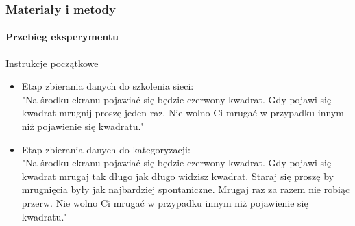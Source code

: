 \documentclass{beamer}
\begin{document}
\begin{frame}	
    \frametitle{Materiały i metody}
    \framesubtitle{Przebieg eksperymentu}
    \pause
    \begin{block}{Instrukcje początkowe}
        \pause
        \begin{itemize} [<+->]
            \item Etap zbierania danych do szkolenia sieci:\\
                "Na środku ekranu pojawiać się będzie czerwony kwadrat. 
                Gdy pojawi się kwadrat mrugnij proszę jeden raz. 
                Nie wolno Ci mrugać w przypadku innym niż pojawienie się kwadratu." 
            \item Etap zbierania danych do kategoryzacji:\\
                "Na środku ekranu pojawiać się będzie czerwony kwadrat. 
                Gdy pojawi się kwadrat mrugaj tak długo jak długo widzisz kwadrat. 
                Staraj się proszę by mrugnięcia były jak najbardziej spontaniczne. 
                Mrugaj raz za razem nie robiąc przerw. 
                Nie wolno Ci mrugać w przypadku innym niż pojawienie się kwadratu." 
        \end{itemize}
    \end{block}
\end{frame}

\begin{frame}[plain]{}
\end{frame}

\begin{frame}[plain]{}
\end{frame}
\end{document}
